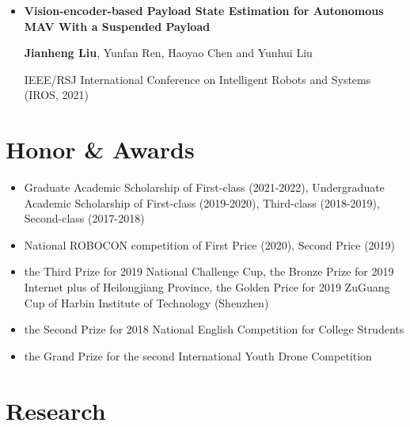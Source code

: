 \documentclass[11pt,a4paper,sans]{moderncv}        %
\begin{document}
{\begin{itemize}
{\small{RA-L and IROS, 2022 (\textbf{Under review}) }
}

\vspace{3pt}

\item{\textbf{Vision-encoder-based Payload State Estimation for Autonomous MAV With a Suspended Payload}

\small{\textbf{Jianheng Liu}, Yunfan Ren, Haoyao Chen and Yunhui Liu}

\small{IEEE/RSJ International Conference on Intelligent Robots and Systems (IROS, 2021) }
}


\end{itemize}

\section{Honor \& Awards}

\vspace{6pt}

\begin{itemize}

\item{Graduate Academic Scholarship of First-class (2021-2022), Undergraduate Academic Scholarship of First-class (2019-2020), Third-class (2018-2019), Second-class (2017-2018)}

\item{National ROBOCON competition of First Price (2020), Second Price (2019)}

\item{the Third Prize for 2019 National Challenge Cup, the Bronze Prize for 2019 Internet plus of Heilongjiang Province, the Golden Price for 2019  ZuGuang Cup of Harbin Institute of Technology (Shenzhen)}

\item{the Second Prize for 2018 National English Competition for College Strudents}

\item{the Grand Prize for the second International Youth Drone Competition}

\end{itemize}


\section{Research}

}
\end{document}
